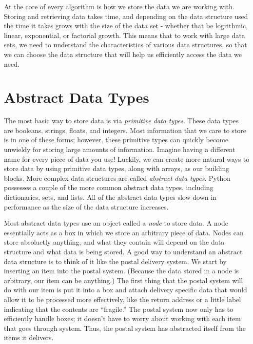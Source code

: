 \label{lab:Python_DataStructures}

At the core of every algorithm is how we store the data we are working with.
Storing and retrieving data takes time, and depending on the data structure used the time it takes grows with the size of the data set - whether that be logrithmic, linear, exponential, or factorial growth.
This means that to work with large data sets, we need to understand the characteristics of various data structures, so that we can choose the data structure that will help us efficiently access the data we need.

\section*{Abstract Data Types}

The most basic way to store data is via \emph{primitive data types}.
These data types are booleans, strings, floats, and integers.
Most information that we care to store is in one of these forms;
however, these primitive types can quickly become unwieldy for storing large amounts of information.
Imagine having a different name for every piece of data you use!
Luckily, we can create more natural ways to store data by using primitive data types, along with arrays, as our building blocks.
More complex data structures are called \emph{abstract data types}.
Python possesses a couple of the more common abstract data types, including dictionaries, sets, and lists.
All of the abstract data types slow down in performance as the size of the data structure increases. %

Most abstract data types use an object called a \emph{node} to store data.
A node essentially acts as a box in which we store an arbitrary piece of data.
Nodes can store absoluetly anything, and what they contain will depend on the data structure and what data is being stored.
A good way to understand an abstract data structure is to think of it like the postal delivery system.
We start by inserting an item into the postal system.  (Because the data stored in a node is arbitrary, our item can be anything.)
The first thing that the postal system will do with our item is put it into a box and attach delivery specific data that would allow it to be processed more effectively, 
like the return address or a little label indicating that the contents are ``fragile.''
The postal system now only has to efficiently handle boxes;
it doesn't have to worry about working with each item that goes through system.
Thus, the postal system has abstracted itself from the items it delivers.

